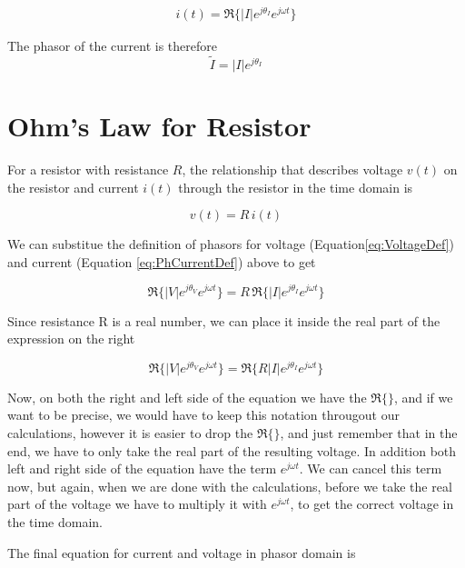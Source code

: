 \documentclass{ximera}
\begin{document}
\begin{eqnarray}
i(t)=\Re\{|I|e^{j\theta_{I}} e^{j \omega t}\}\label{eq:PhCurrentDef} 
\end{eqnarray}

The phasor of the current is therefore
\begin{equation}
\tilde{I}=|I|e^{j\theta_{I}}
\end{equation}



\section{Ohm's Law for Resistor}

For a  resistor with resistance $R$, the relationship that describes voltage $v(t)$ on the resistor and  current $i(t)$ through the resistor in the time domain is

\begin{equation}
v(t)=R \, i(t)
\end{equation}

We can substitue the definition of phasors for voltage (Equation\ref{eq:VoltageDef}) and current (Equation \ref{eq:PhCurrentDef})  above to get

\begin{equation}
 \Re\{|V|e^{j\theta_{V}} e^{j \omega t}\}   = R \, \Re\{|I|e^{j\theta_{I}} e^{j \omega t}\}
\end{equation}

Since resistance R is a real number, we can place it inside the real part of the expression on the right

\begin{equation}
 \Re\{|V|e^{j\theta_{V}} e^{j \omega t}\}   =   \Re\{ R |I|e^{j\theta_{I}} e^{j \omega t}\}
\end{equation}

Now, on both the right and left side of the equation we have the $\Re\{\}$, and if we want to be precise, we would have to keep this notation througout our calculations, however it is easier to drop the $\Re\{\}$, and just remember that in the end, we have to only take the real part of the resulting voltage. In addition both left and right side of the equation have the term $e^{j \omega t}$. We can cancel this term now, but again, when we are done with the calculations, before we take the real part of the voltage we have to multiply it with $e^{j \omega t}$, to get the correct voltage in the time domain.

The final equation for current and voltage in phasor domain is
\end{document}
